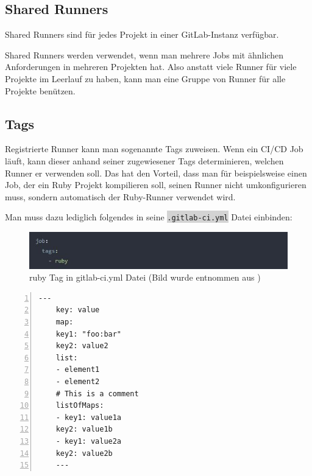 \subsection{Shared Runners}

Shared Runners sind für jedes Projekt in einer GitLab-Instanz verfügbar.

Shared Runners werden verwendet, wenn man mehrere Jobs mit ähnlichen Anforderungen in mehreren Projekten hat. Also anstatt viele Runner für viele Projekte im Leerlauf zu haben, kann man eine Gruppe von Runner für alle Projekte benützen.\autocite{gitlabSharedRunner}

\subsection{Tags}

Registrierte Runner kann man sogenannte Tags zuweisen. Wenn ein CI/CD Job läuft, kann dieser anhand seiner zugewiesener Tags determinieren, welchen Runner er verwenden soll. Das hat den Vorteil, dass man für beispielsweise einen Job, der ein Ruby Projekt kompilieren soll, seinen Runner nicht umkonfigurieren muss, sondern automatisch der Ruby-Runner verwendet wird.

Man muss dazu lediglich folgendes in seine  \colorbox{lightgray}{\texttt{.gitlab-ci.yml}} Datei einbinden:

\begin{figure}[h]
	\centerline{
		\includegraphics{./grafiken/ruby_runner_tag_in_gitlab-ci-yml_file.JPG}
	}
	\vskip0pt
	\caption{ruby Tag in gitlab-ci.yml Datei (Bild wurde entnommen aus \autocite{gitlabRunner})}
\end{figure}
\autocite{gitlabPipelines}

\begin{lstlisting}[caption={yaml besipiel},captionpos=b, numbers=left, backgroundcolor=\color{black!10}, language=docker-compose]
	---
	key: value
	map:
	key1: "foo:bar"
	key2: value2
	list:
	- element1
	- element2
	# This is a comment
	listOfMaps:
	- key1: value1a
	key2: value1b
	- key1: value2a
	key2: value2b
	---
\end{lstlisting}
